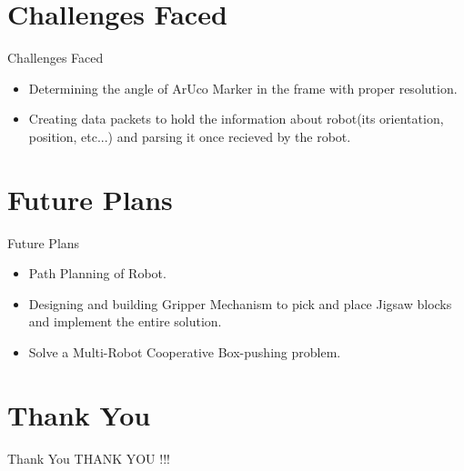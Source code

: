 \documentclass[10pt, a4paper]{beamer}
\begin{document}
\section{Challenges Faced}
\begin{frame}{Challenges Faced}
	\begin{itemize}
		\item Determining the angle of ArUco Marker in the frame with proper resolution.
		\item Creating data packets to hold the information about robot(its orientation, position, etc...) and parsing it once recieved by the robot.
	\end{itemize}
\end{frame}

\section{Future Plans}
\begin{frame}{Future Plans}
	\begin{itemize}
		\item Path Planning of Robot.
		\item Designing and building Gripper Mechanism to pick and place Jigsaw blocks and implement the entire solution.
		\item Solve a Multi-Robot Cooperative Box-pushing problem.
	\end{itemize}
\end{frame}


\section{Thank You}
\begin{frame}{Thank You}
	\centering THANK YOU !!!
\end{frame}
\end{document}
